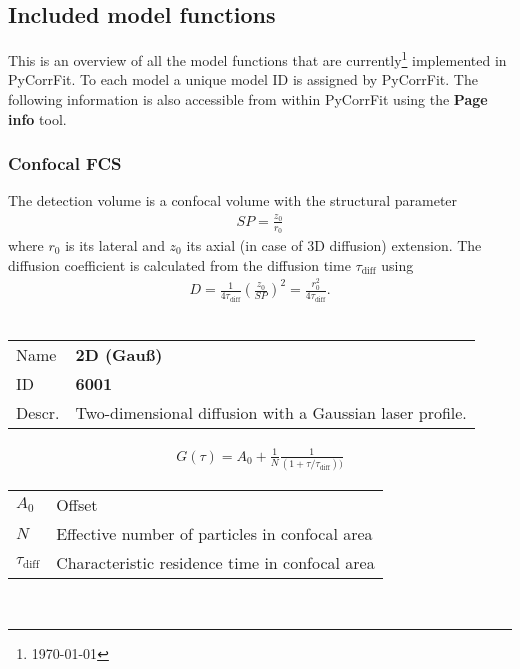\subsection{Included model functions}
This is an overview of all the model functions that are currently\footnote{\today} implemented in PyCorrFit. To each model a unique model ID is assigned by PyCorrFit. The following information is also accessible from within PyCorrFit using the \textbf{Page info} tool.

\subsubsection{Confocal FCS}
The detection volume is a confocal volume with the structural parameter 
\begin{align}
\mathit{SP}= \frac{z_0}{r_0}
\end{align}
where $r_0$ is its lateral and $z_0$ its axial (in case of 3D diffusion) extension. The diffusion coefficient is calculated from the diffusion time $\tau_\mathrm{diff}$ using
\begin{align}
D = \frac{1}{4 \tau_\mathrm{diff}} \left( \frac{z_0}{\mathit{SP}} \right)^2 = \frac{r_0^2}{4 \tau_\mathrm{diff}}.
\end{align}
\\


\noindent \begin{tabular}{lp{}}
Name & \textbf{2D (Gauß)} \\ 
ID & \textbf{6001} \\ 
Descr. &  Two-dimensional diffusion with a Gaussian laser profile. \\ 
\end{tabular}
\begin{align}
G(\tau) = A_0 + \frac{1}{N} \frac{1}{(1+\tau/\tau_\mathrm{diff}) )}
\end{align} 
\begin{center}
\begin{tabular}{ll}
$A_0$ & Offset \\ 
$N$ & Effective number of particles in confocal area \\ 
$\tau_\mathrm{diff}$ &   Characteristic residence time in confocal area \\
\end{tabular} \\
\end{center}
\vspace{2em}


